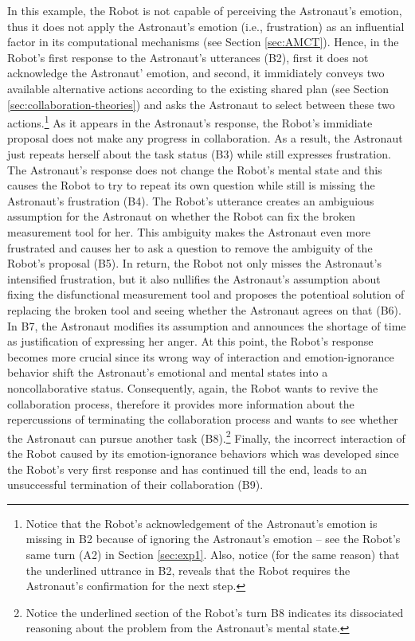 In this example, the Robot is not capable of perceiving the Astronaut's emotion,
thus it does not apply the Astronaut's emotion (i.e., frustration) as an
influential factor in its computational mechanisms (see Section \ref{sec:AMCT}).
Hence, in the Robot's first response to the Astronaut's utterances (B2), first
it does not acknowledge the Astronaut' emotion, and second, it immidiately
conveys two available alternative actions according to the existing shared plan
(see Section \ref{sec:collaboration-theories}) and asks the Astronaut to select
between these two actions.\footnote{Notice that the Robot's acknowledgement of
the Astronaut's emotion is missing in B2 because of ignoring the Astronaut's
emotion -- see the Robot's same turn (A2) in Section \ref{sec:exp1}. Also,
notice (for the same reason) that the underlined uttrance in B2, reveals that
the Robot requires the Astronaut's confirmation for the next step.} As it
appears in the Astronaut's response, the Robot's immidiate proposal does not
make any progress in collaboration. As a result, the Astronaut just repeats
herself about the task status (B3) while still expresses frustration. The
Astronaut's response does not change the Robot's mental state and this causes
the Robot to try to repeat its own question while still is missing the
Astronaut's frustration (B4). The Robot's utterance creates an ambiguious
assumption for the Astronaut on whether the Robot can fix the broken measurement
tool for her. This ambiguity makes the Astronaut even more frustrated and causes
her to ask a question to remove the ambiguity of the Robot's proposal (B5). In
return, the Robot not only misses the Astronaut's intensified frustration, but
it also nullifies the Astronaut's assumption about fixing the disfunctional
measurement tool and proposes the potentioal solution of replacing the broken
tool and seeing whether the Astronaut agrees on that (B6). In B7, the Astronaut
modifies its assumption and announces the shortage of time as justification of
expressing her anger. At this point, the Robot's response becomes more crucial
since its wrong way of interaction and emotion-ignorance behavior shift the
Astronaut's emotional and mental states into a noncollaborative status.
Consequently, again, the Robot wants to revive the collaboration process,
therefore it provides more information about the repercussions of terminating
the collaboration process and wants to see whether the Astronaut can pursue
another task (B8).\footnote{Notice the underlined section of the Robot's turn
B8 indicates its dissociated reasoning about the problem from the Astronaut's
mental state.} Finally, the incorrect interaction of the Robot caused by its
emotion-ignorance behaviors which was developed since the Robot's very first
response and has continued till the end, leads to an unsuccessful termination of
their collaboration (B9).\\

